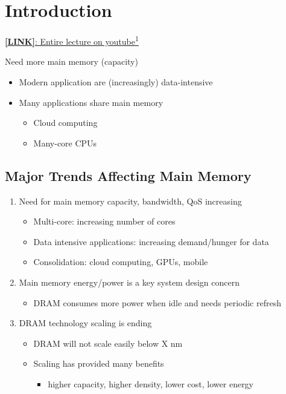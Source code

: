 \documentclass[]{article}
\date{}
\providecommand{\tightlist}{%
  \setlength{\itemsep}{0pt}\setlength{\parskip}{0pt}}
\begin{document}
\hypertarget{introduction}{%
\section{Introduction}\label{introduction}}

\href{https://www.youtube.com/watch?v=IUk9o9wvX1Y\&t=3094s}{\textbf{{[}LINK{]}}:
Entire lecture on youtube\textsuperscript{1}}

Need more main memory (capacity)

\begin{itemize}
\tightlist
\item
  Modern application are (increasingly) data-intensive
\item
  Many applications share main memory

  \begin{itemize}
  \tightlist
  \item
    Cloud computing
  \item
    Many-core CPUs
  \end{itemize}
\end{itemize}

\hypertarget{major-trends-affecting-main-memory}{%
\subsection{Major Trends Affecting Main
Memory}\label{major-trends-affecting-main-memory}}

\begin{enumerate}
\def\labelenumi{\arabic{enumi}.}
\tightlist
\item
  Need for main memory capacity, bandwidth, QoS increasing

  \begin{itemize}
  \tightlist
  \item
    Multi-core: increasing number of cores
  \item
    Data intensive applications: increasing demand/hunger for data
  \item
    Consolidation: cloud computing, GPUs, mobile
  \end{itemize}
\item
  Main memory energy/power is a key system design concern

  \begin{itemize}
  \tightlist
  \item
    DRAM consumes more power when idle and needs periodic refresh
  \end{itemize}
\item
  DRAM technology scaling is ending

  \begin{itemize}
  \tightlist
  \item
    DRAM will not scale easily below X nm
  \item
    Scaling has provided many benefits

    \begin{itemize}
    \tightlist
    \item
      higher capacity, higher density, lower cost, lower energy
    \end{itemize}
  \end{itemize}
\end{enumerate}
\end{document}

